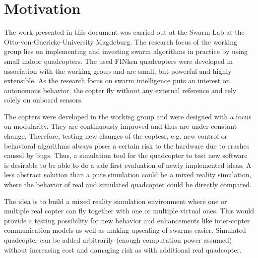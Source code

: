 

\section{Motivation}
\label{sec:motivation}
The work presented in this document was carried out at the Swarm Lab at the Otto-von-Guericke-University Magdeburg. 
The research focus of the working group lies on implementing and investing swarm algorithms in practice by using small indoor quadcopters. 
The used FINken quadcopters were developed in association with the working group and are small, but powerful and highly extensible. 
As the research focus on swarm intelligence puts an interest on autonomous behavior, the copter fly without any external reference and rely solely on onboard sensors.

The copters were developed in the working group and were designed with a focus on modularity.
They are continuously improved and thus are under constant change. 
Therefore, testing new changes of the coptesr, e.g. new control or behavioral algorithms always poses a certain risk to the hardware due to crashes caused by bugs. 
Thus, a simulation tool for the quadcopter to test new software is desirable to be able to do a safe first evaluation of newly implemented ideas. 
A less abstract solution than a pure simulation could be a mixed reality simulation, where the behavior of real and simulated quadcopter could be directly compared.

The idea is to build a mixed reality simulation environment where one or multiple real copter can fly together with one or multiple virtual ones. 
This would provide a testing possibility for new behavior and enhancements like inter-copter communication models as well as making upscaling of swarms easier. 
Simulated quadcopter can be added arbitrarily (enough computation power assumed) without increasing cost and damaging risk as with additional real quadcopter. 

